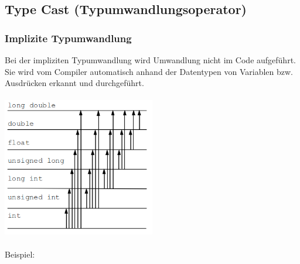 			\subsection{Type Cast (Typumwandlungsoperator) }	
				\begin{minipage}[t]{9 cm}
					\subsubsection{Implizite Typumwandlung}
						Bei der impliziten Typumwandlung wird Umwandlung nicht im Code aufgeführt. Sie wird vom Compiler automatisch anhand der Datentypen von Variablen bzw. Ausdrücken erkannt und durchgeführt.\\\\
						\includegraphics[width=0.5\textwidth]{pics/typecast.png}	
						\\\\Beispiel:
						\vspace*{-0.2cm}
							
				\end{minipage}
				\hspace*{0.5cm}
